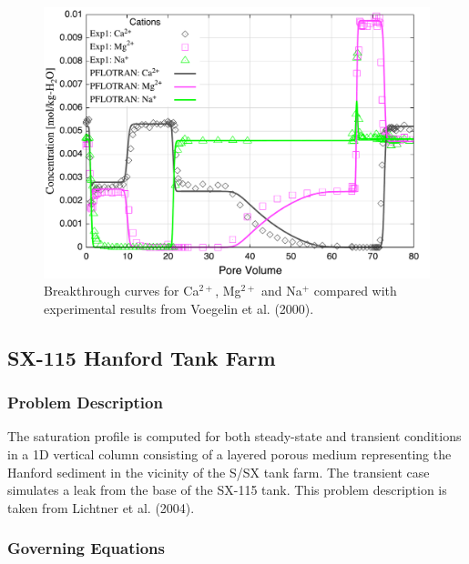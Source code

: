 \documentclass[12pt]{article}
\begin{document}
\begin{figure}[h]\centering
\includegraphics[scale=0.5]{./figs/ionex}
\caption{Breakthrough curves for Ca$^{2+}$, Mg$^{2+}$ and Na$^+$ compared with experimental results from Voegelin et al. (2000).}\label{fionex}
\end{figure}

\newpage
\footnotesize
{}\label{tionex}
\normalsize

\newpage

\subsection{SX-115 Hanford Tank Farm}

\subsubsection{Problem Description}

The saturation profile is computed for both steady-state and transient conditions in a 1D vertical column consisting of a layered porous medium representing the Hanford sediment in the vicinity of the S/SX tank farm. The transient case simulates a leak from the base of the SX-115 tank. This problem description is taken from Lichtner et al. (2004).

\subsubsection{Governing Equations}
\end{document}
